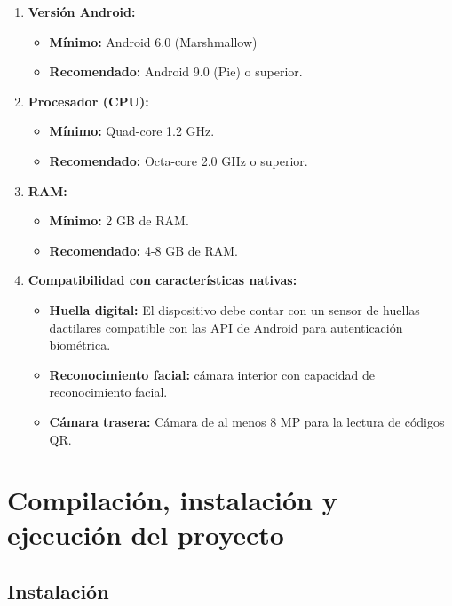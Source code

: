 \begin{enumerate}

\item\textbf{Versión Android:}
	\begin{itemize}
	\item\textbf{Mínimo:}  Android 6.0 (Marshmallow)
	\item\textbf{Recomendado:} Android 9.0 (Pie) o superior.
	\end{itemize}
	
\item\textbf{Procesador (CPU):}
	\begin{itemize}
	\item\textbf{Mínimo:} Quad-core 1.2 GHz.
	\item\textbf{Recomendado:} Octa-core 2.0 GHz o superior.
	\end{itemize}
	
\item\textbf{RAM:}
	\begin{itemize}
	\item\textbf{Mínimo:} 2 GB de RAM.
	\item\textbf{Recomendado:} 4-8 GB de RAM.
	\end{itemize}
	
\item\textbf{Compatibilidad con características nativas:}
	\begin{itemize}
	\item\textbf{Huella digital:} El dispositivo debe contar con un sensor de huellas dactilares compatible con
	las API de Android para autenticación biométrica.
	\item\textbf{Reconocimiento facial:} cámara interior con capacidad de reconocimiento facial.
	\item\textbf{Cámara trasera:} Cámara de al menos 8 MP para la lectura de códigos QR.
	\end{itemize}

\end{enumerate}


\section{Compilación, instalación y ejecución del proyecto}
\label{instalacionProyecto}

\subsection{Instalación}

